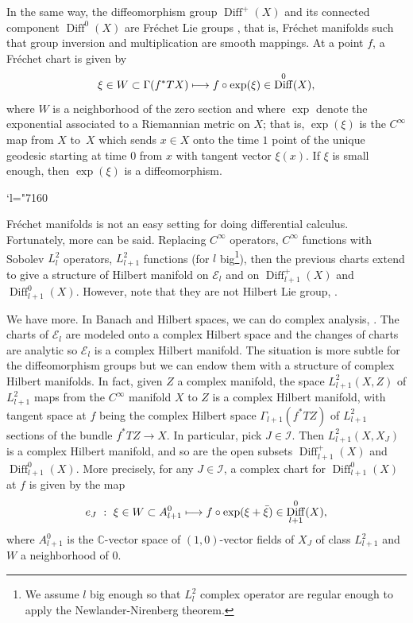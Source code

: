 \documentclass[JEP,XML,SOM,Unicode]{cedram}
\let\mathcal\mathscr
\newcommand{\Changel}{\mathcode`l="7160}
\def\mto{\mathchoice{\longmapsto}{\mapsto}{\mapsto}{\mapsto}}
\DeclareMathOperator{\Diff}{Diff}
\theoremstyle{plain}
\theoremstyle{definition}
\theoremstyle{remark}
\numberwithin{equation}{section}
\newcommand{\CC}{{\mathbb{C}}}
\newcommand{\cI}{\mathcal{I}}
\begin{document}
In the same way, the diffeomorphism group $\Diff^+(X)$ and its connected component $\Diff^0(X)$ are Fréchet Lie groups \cite{Les1}, that is, Fréchet manifolds such that group inversion and multiplication are smooth mappings. At a point $f$, a Fréchet chart is given by
\begin{equation}
\label{Frechetchart}
\xi\in W\subset \Gamma(f^*TX)\mto f\circ\exp (\xi)\in \Diff^0 (X),
\end{equation}
where $W$ is a neighborhood of the zero section and where $\exp$ denote the exponential associated to a Riemannian metric on $X$; that is, $\exp(\xi)$ is the $C^\infty$ map from $X$ to~$X$ which sends $x\in X$ onto the time $1$ point of the unique geodesic starting at time $0$ from $x$ with tangent vector $\xi(x)$. If $\xi$ is small enough, then $\exp(\xi)$ is a diffeomorphism.

\Changel

Fréchet manifolds is not an easy setting for doing differential calculus.
Fortunately, more can be said. Replacing $C^\infty$ operators, \resp $C^\infty$ functions with Sobolev $L^2_l$ operators, \resp $L^2_{l+1}$ functions (for $l$ big\footnote{We assume $l$ big enough so that $L^2_l$ complex operator are regular enough to apply the Newlander-Nirenberg theorem.}), then the previous charts extend to give a structure of Hilbert manifold on $\mathcal E_l$ and on $\Diff^+_{l+1}(X)$ and $\Diff^{0}_{l+1}(X)$. However, note that they are not Hilbert Lie group, \cf \cite{MNR}.

We have more. In Banach and Hilbert spaces, we can do complex analysis, \cf \cite{Douady}. The charts of $\mathcal E_l$ are modeled onto a complex Hilbert space and the changes of charts are analytic so $\mathcal E_l$ is a complex Hilbert manifold. The situation is more subtle for the diffeomorphism groups but we can endow them with a structure of complex Hilbert manifolds. In fact, given $Z$ a complex manifold, the space $L^2_{l+1}(X,Z)$ of $L^2_{l+1}$ maps from the $C^\infty$ manifold $X$ to $Z$ is a complex Hilbert manifold, with tangent space at $f$ being the complex Hilbert space $\Gamma_{l+1}(f^*TZ)$ of $L^2_{l+1}$ sections of the bundle $f^*TZ\to X$. In particular, pick $J\in\cI$. Then $L^2_{l+1}(X,X_J)$ is a complex Hilbert manifold, and so are the open subsets $\Diff^+_{l+1}(X)$ and $\Diff^{0}_{l+1}(X)$. More precisely,
for any $J\in\cI$, a complex chart for $\Diff_{l+1}^0(X)$ at $f$ is given by the map
\begin{equation}
\label{chart}
e_J\ :\ \xi\in W\subset A^0_{l+1}\mto f\circ\exp (\xi+\bar \xi)\in \Diff_{l+1}^0 (X),
\end{equation}
where $A^0_{l+1}$ is the $\CC$-vector space of $(1,0)$-vector fields of $X_J$ of class $L^2_{l+1}$ and $W$ a neighborhood of $0$.
\end{document}
